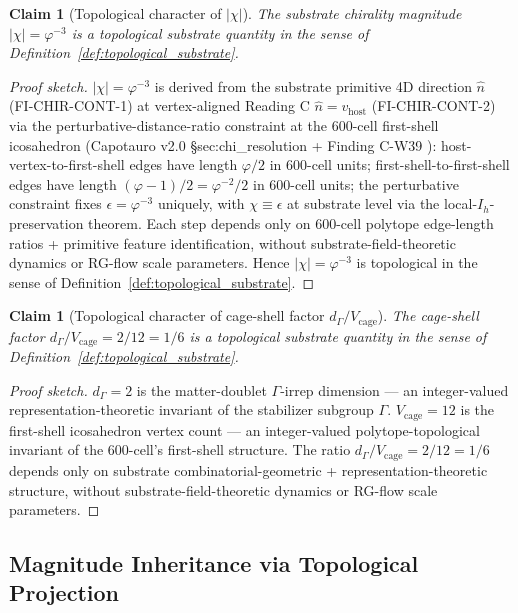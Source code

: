 \documentclass[11pt,letterpaper]{article}
\newtheorem{claim}[theorem]{Claim}
\newcommand{\Ih}{I_h}
\newcommand{\Vcage}{V_{\text{cage}}}
\newcommand{\dGamma}{d_\Gamma}
\begin{document}
\begin{claim}[Topological character of $|\chi|$]
\label{claim:chi_topological}
The substrate chirality magnitude $|\chi| = \varphi^{-3}$ is a topological substrate quantity in the sense of Definition~\ref{def:topological_substrate}.
\end{claim}

\begin{proof}[Proof sketch]
$|\chi| = \varphi^{-3}$ is derived from the substrate primitive 4D direction $\hat{n}$ (FI-CHIR-CONT-1) at vertex-aligned Reading C $\hat{n} = v_{\text{host}}$ (FI-CHIR-CONT-2) via the perturbative-distance-ratio constraint at the 600-cell first-shell icosahedron (Capotauro v2.0 §sec:chi\_resolution + Finding C-W39 \cite{Capotauro}): host-vertex-to-first-shell edges have length $\varphi/2$ in 600-cell units; first-shell-to-first-shell edges have length $(\varphi-1)/2 = \varphi^{-2}/2$ in 600-cell units; the perturbative constraint fixes $\epsilon = \varphi^{-3}$ uniquely, with $\chi \equiv \epsilon$ at substrate level via the local-$\Ih$-preservation theorem. Each step depends only on 600-cell polytope edge-length ratios + primitive feature identification, without substrate-field-theoretic dynamics or RG-flow scale parameters. Hence $|\chi| = \varphi^{-3}$ is topological in the sense of Definition~\ref{def:topological_substrate}.
\end{proof}

\begin{claim}[Topological character of cage-shell factor $\dGamma/\Vcage$]
\label{claim:cage_shell_topological}
The cage-shell factor $\dGamma/\Vcage = 2/12 = 1/6$ is a topological substrate quantity in the sense of Definition~\ref{def:topological_substrate}.
\end{claim}

\begin{proof}[Proof sketch]
$\dGamma = 2$ is the matter-doublet $\Gamma$-irrep dimension --- an integer-valued representation-theoretic invariant of the stabilizer subgroup $\Gamma$. $\Vcage = 12$ is the first-shell icosahedron vertex count --- an integer-valued polytope-topological invariant of the 600-cell's first-shell structure. The ratio $\dGamma/\Vcage = 2/12 = 1/6$ depends only on substrate combinatorial-geometric + representation-theoretic structure, without substrate-field-theoretic dynamics or RG-flow scale parameters.
\end{proof}

\subsection{Magnitude Inheritance via Topological Projection}
\label{sec:magnitude_inheritance}
\end{document}
